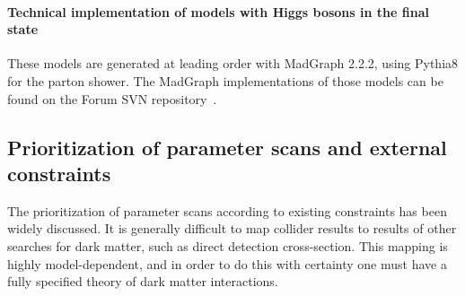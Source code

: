 \documentclass[a4,debug,notitlepage,nobib]{tufte-handout}
\begin{document}


\paragraph{Technical implementation of models with Higgs bosons in the final state} 

These models are generated at leading
order with MadGraph 2.2.2, using Pythia8 for the parton shower.
The MadGraph implementations of those models can be found on the Forum SVN 
repository~\cite{ForumSVN_EWMonoHiggs}.






\subsection{Prioritization of parameter scans and external constraints}

The prioritization of parameter scans according to existing constraints 
has been widely discussed. It is generally difficult to map
collider results to results of other searches for dark matter, such as
direct detection cross-section. This mapping is highly
model-dependent, and in order to do this with certainty one must have
a fully specified theory of dark matter interactions. 
\end{document}
